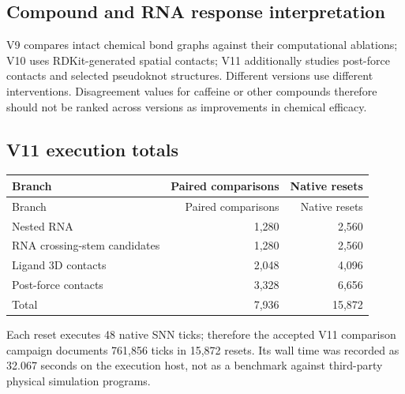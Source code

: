 \documentclass[11pt,a4paper]{article}
\begin{document}
\subsection{Compound and RNA response interpretation}
V9 compares intact chemical bond graphs against their computational ablations; V10 uses RDKit-generated spatial contacts; V11 additionally studies post-force contacts and selected pseudoknot structures. Different versions use different interventions. Disagreement values for caffeine or other compounds therefore should not be ranked across versions as improvements in chemical efficacy.

\subsection{V11 execution totals}

\begin{center}\small\begin{longtable}{lrr}
\toprule
Branch & Paired comparisons & Native resets\\
\midrule
\endfirsthead
\toprule
Branch & Paired comparisons & Native resets\\
\midrule
\endhead
Nested RNA & 1,280 & 2,560\\
RNA crossing-stem candidates & 1,280 & 2,560\\
Ligand 3D contacts & 2,048 & 4,096\\
Post-force contacts & 3,328 & 6,656\\
Total & 7,936 & 15,872\\
\bottomrule
\end{longtable}
\end{center}
Each reset executes 48 native SNN ticks; therefore the accepted V11 comparison campaign documents 761,856 ticks in 15,872 resets. Its wall time was recorded as 32.067 seconds on the execution host, not as a benchmark against third-party physical simulation programs.
\end{document}
